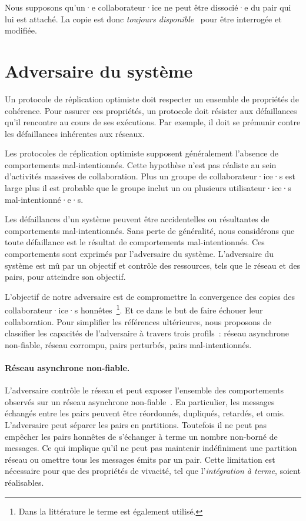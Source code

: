 Nous supposons qu'un·e collaborateur·ice ne peut être dissocié·e du pair qui lui est attaché.
La copie est donc \emph{toujours disponible}~\autocite{mahajan_2011_cac} pour être interrogée et modifiée.


\section{Adversaire du système}

Un protocole de réplication optimiste doit respecter un ensemble de propriétés de cohérence.
Pour assurer ces propriétés, un protocole doit résister aux défaillances qu'il rencontre au cours de ses exécutions.
Par exemple, il doit se prémunir contre les défaillances inhérentes aux réseaux.

Les protocoles de réplication optimiste supposent généralement l'absence de comportements mal-intentionnés.
Cette hypothèse n'est pas réaliste au sein d'activités massives de collaboration.
Plus un groupe de collaborateur·ice·s est large plus il est probable que le groupe inclut un ou plusieurs utilisateur·ice·s mal-intentionné·e·s.

Les défaillances d'un système peuvent être accidentelles ou résultantes de comportements mal-intentionnés.
Sans perte de généralité, nous considérons que toute défaillance est le résultat de comportements mal-intentionnés.
Ces comportements sont exprimés par l'adversaire du système.
L'adversaire du système est mû par un objectif et contrôle des ressources, tels que le réseau et des pairs, pour atteindre son objectif.

L'objectif de notre adversaire est de compromettre la convergence des copies des collaborateur·ice·s honnêtes~\footnote{Dans la littérature le terme  est également utilisé.}.
Et ce dans le but de faire échouer leur collaboration.
Pour simplifier les références ultérieures, nous proposons de classifier les capacités de l'adversaire à travers trois profils~: réseau asynchrone non-fiable, réseau corrompu, pairs perturbés, pairs mal-intentionnés.

\paragraph{Réseau asynchrone non-fiable.} L'adversaire contrôle le réseau et peut exposer l'ensemble des comportements observés sur un réseau asynchrone non-fiable~\autocite{lynch_1996_asyncnet}.
En particulier, les messages échangés entre les pairs peuvent être réordonnés, dupliqués, retardés, et omis.
L'adversaire peut séparer les pairs en partitions.
Toutefois il ne peut pas empêcher les pairs honnêtes de s'échanger à terme un nombre non-borné de messages.
Ce qui implique qu'il ne peut pas maintenir indéfiniment une partition réseau ou omettre tous les messages émits par un pair.
Cette limitation est nécessaire pour que des propriétés de vivacité, tel que l'\emph{intégration à terme}, soient réalisables.

